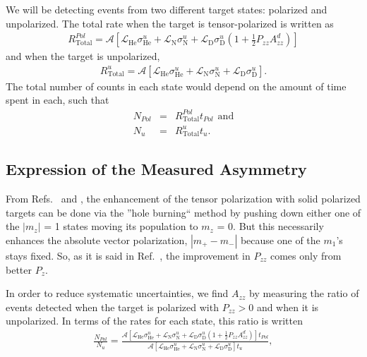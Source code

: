 \documentclass[11pt]{article}
\begin{document}
We will be detecting events from two different target states: polarized and unpolarized. The total rate when the target is tensor-polarized is written as
\begin{eqnarray}
R_{\mathrm{Total}}^{Pol} = \mathcal{A}\left[ \mathcal{L}_{\mathrm{He}} \sigma_{\mathrm{He}}^u  + \mathcal{L}_{\mathrm{N}} \sigma_{\mathrm{N}}^u + \mathcal{L}_{\mathrm{D}} \sigma_{\mathrm{D}}^u\left( 1 + \frac{1}{2}P_{zz}A_{zz}^d \right) \right] 
\end{eqnarray}
 and when the target is unpolarized,
 \begin{eqnarray}
R_{\mathrm{Total}}^{u} = \mathcal{A}\left[ \mathcal{L}_{\mathrm{He}} \sigma_{\mathrm{He}}^u  + \mathcal{L}_{\mathrm{N}} \sigma_{\mathrm{N}}^u + \mathcal{L}_{\mathrm{D}} \sigma_{\mathrm{D}}^u \right]. 
\end{eqnarray}
The total number of counts in each state would depend on the amount of time spent in each, such that
\begin{eqnarray}
N_{Pol} &=& R_{\mathrm{Total}}^{Pol}t_{Pol}\hspace{5pt}\mathrm{and} \\
N_{u} &=& R_{\mathrm{Total}}^{u}t_{u}.
\end{eqnarray}


\subsection{Expression of the Measured Asymmetry}

From Refs.~\cite{meyer} and \cite{uvatn}, the enhancement of the  tensor polarization with solid polarized targets can be done via the ''hole burning`` method by pushing down either one of the $|m_z|$ = 1 states moving its population to $m_z$ = 0. But this necessarily enhances the absolute vector polarization, $|m_+ - m_-|$ because one of the $m_1$'s stays fixed. So, as it is said in Ref.~\cite{meyer}, the improvement in $P_{zz}$ comes only from better $P_z$. 

In order to reduce systematic uncertainties, we find $A_{zz}$ by measuring the ratio of events detected when the target is polarized with $P_{zz}>0$ and when it is unpolarized. In terms of the rates for each state, this ratio is written
\begin{eqnarray}
\frac{N_{Pol}}{N_u} = \frac{\mathcal{A}\left[ \mathcal{L}_{\mathrm{He}} \sigma_{\mathrm{He}}^u  + \mathcal{L}_{\mathrm{N}} \sigma_{\mathrm{N}}^u + \mathcal{L}_{\mathrm{D}} \sigma_{\mathrm{D}}^u\left( 1 + \frac{1}{2}P_{zz}A_{zz}^d \right) \right] t_{Pol}}{ \mathcal{A}\left[ \mathcal{L}_{\mathrm{He}} \sigma_{\mathrm{He}}^u  + \mathcal{L}_{\mathrm{N}} \sigma_{\mathrm{N}}^u + \mathcal{L}_{\mathrm{D}} \sigma_{\mathrm{D}}^u \right] t_u },
\end{eqnarray}
\end{document}
